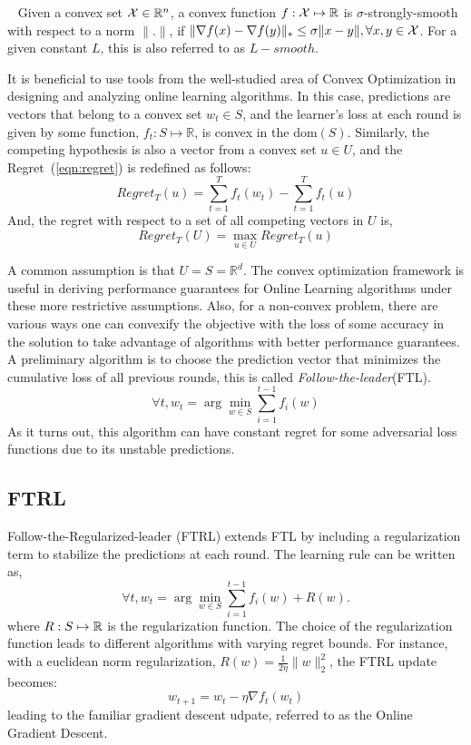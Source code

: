 \begin{definition}~\label{def:strsmooth}
	Given a convex set $\mathcal{X} \in \mathbb{R}^n$, a convex function $f: \mathcal{X} \mapsto \mathbb{R}$ is
	$\sigma$-strongly-smooth with respect to a norm $\|.
		\|$, if $\|\nabla f(x) - \nabla f(y) \|_{\ast} \leq \sigma \|x - y \|, \forall x, y \in \mathcal{X}$.
	For a given constant $L$, this is also referred to as $L-smooth$.
\end{definition}


It is beneficial to use tools from the well-studied area of Convex Optimization in designing and
analyzing online learning algorithms.
In this case, predictions are vectors that belong to a convex set $w_t \in S$, and the learner's
loss at each round is given by some function, $f_t: S \mapsto \mathbb{R}$, is convex in the
$\text{dom}(S)$.
Similarly, the competing hypothesis is also a vector from a convex set $u \in U$, and the
Regret~(\ref{eqn:regret}) is redefined as follows:
\begin{equation}
	Regret_T(u) = \sum_{t=1}^T
	f_t(w_t) - \sum_{t=1}^T f_t(u)
\end{equation} And, the regret with respect to a set of all
competing vectors in $U$ is,
\begin{equation}
	Regret_T(U) = \max_{u \in U} Regret_T(u)
\end{equation}

A common assumption is that $U=S=\mathbb{R}^d$.
The convex optimization framework is useful in deriving performance guarantees for Online Learning
algorithms under these more restrictive assumptions.
Also, for a non-convex problem, there are various ways one can convexify the objective with the loss of
some accuracy in the solution to take advantage of algorithms with better performance guarantees.
A preliminary algorithm is to choose the prediction vector that minimizes the cumulative loss of
all previous rounds, this is called \textit{Follow-the-leader}(FTL).
$$ \forall t, w_t = \arg \min_{w \in S} \sum_{i=1}^{t-1} f_i(w)$$
As it turns out, this algorithm can have constant regret for some
adversarial loss functions due to its unstable predictions.

\subsection{FTRL}\label{sec:ftrl}
Follow-the-Regularized-leader (FTRL) extends FTL by including a regularization term to stabilize
the predictions at each round.
The learning rule can be written as, $$\forall t, w_t = \arg \min_{w \in S} \sum_{i=1}^{t-1} f_i(w)
	+ R(w).
$$
where $R: S \mapsto \mathbb{R}$ is the regularization function.
The choice of the regularization function leads to different algorithms with varying regret bounds.
For instance, with a euclidean norm regularization, $R(w) = \frac{1}{2 \eta} \|w\|_2^2$, the FTRL
update becomes:
\begin{equation}
	w_{t+1} = w_t - \eta \nabla f_t(w_t)
\end{equation} leading to the
familiar gradient descent udpate, referred to as the Online Gradient Descent.

